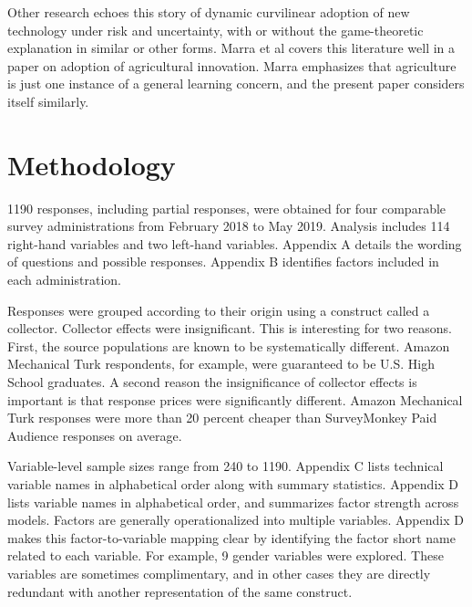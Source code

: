 \documentclass[AER]{./aea-latex-templates/AEA}
\begin{document}
        Other research echoes this story of dynamic curvilinear adoption of new
        technology under risk and uncertainty, with or without the game-theoretic
        explanation in similar or other forms. Marra et al covers this literature
        well in a paper on adoption of agricultural innovation\cite{marra2003economics}. Marra emphasizes
        that agriculture is just one instance of a general learning concern, and
        the present paper considers itself similarly.
        
        \section{Methodology}
        
        1190 responses, including partial responses, were obtained for four
        comparable survey administrations from February 2018 to May 2019.
        Analysis includes 114 right-hand variables and two left-hand variables.
        Appendix A details the wording of questions and possible responses.
        Appendix B identifies factors included in each administration.
        
        Responses were grouped according to their origin using
        a construct called a collector. Collector effects
        were insignificant. This is interesting for two reasons. First, the source
        populations are known to be systematically different. Amazon Mechanical Turk
        respondents, for example, were guaranteed to be U.S. High School graduates. A second
        reason the insignificance of collector effects is important is that
        response prices were significantly different. Amazon Mechanical Turk
        responses were more than 20 percent cheaper than SurveyMonkey Paid Audience
        responses on average.
        
        Variable-level sample sizes range from 240 to 1190. Appendix C lists
        technical variable names in alphabetical order along with summary
        statistics. Appendix D lists variable names in alphabetical order, and
        summarizes factor strength across models. Factors are generally
        operationalized into multiple variables. Appendix D makes this
        factor-to-variable mapping clear by identifying the factor short name
        related to each variable. For example, 9 gender variables were explored.
        These variables are sometimes complimentary, and in other cases they are
        directly redundant with another representation of the same construct.
        
\end{document}
